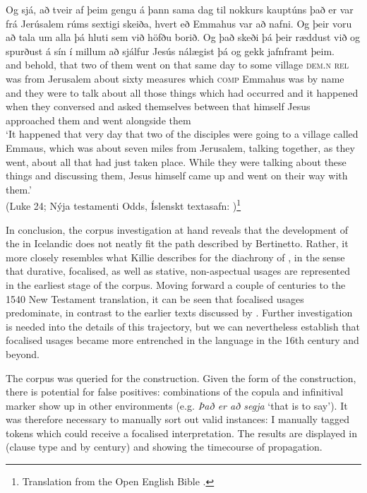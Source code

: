 \documentclass[output=paper,colorlinks,citecolor=brown]{langscibook}
\begin{document}
\ea\label{ex:durative_oddur} 
\gll Og sjá, að tveir af þeim gengu á þann sama dag til nokkurs kauptúns það er var frá Jerúsalem rúms sextigi skeiða, hvert eð Emmahus var að nafni. Og þeir voru að tala um alla þá hluti sem við höfðu borið. Og það skeði þá þeir ræddust við og spurðust á sín í millum að sjálfur Jesús nálægist þá og gekk jafnframt þeim.\\
and behold, that two of them went on that same day to some village \textsc{dem.n} \textsc{rel} was from Jerusalem about sixty measures which \textsc{comp} Emmahus was by name and they were to talk about all those things which {} had occurred and it happened when they conversed {} and asked {} themselves between {} that himself Jesus approached them and went alongside them\\
\glt `It happened that very day that two of the disciples were going to a village called Emmaus, which was about seven miles from Jerusalem, talking together, as they went, about all that had just taken place. While they were talking about these things and discussing them, Jesus himself came up and went on their way with them.' \\ \hfill (Luke 24; Nýja testamenti Odds, Íslenskt textasafn: \citeauthor{IslensktTextasafn2019} \citeyear{IslensktTextasafn2019})\footnote{Translation from the Open English Bible \citep{oeb2022}.}
\z

In conclusion, the corpus investigation at hand reveals that the development of the    in Icelandic does not neatly fit the path described by Bertinetto. Rather, it more closely resembles what Killie describes for the diachrony of , in the sense that durative, focalised, as well as stative, non-aspectual usages are represented in the earliest stage of the corpus. Moving forward a couple of centuries to the 1540 New Testament translation, it can be seen that focalised usages predominate, in contrast to the earlier texts discussed by \citet{benediktsson1976isl}. Further investigation is needed into the details of this trajectory, but we can nevertheless establish that focalised usages became more entrenched in the language in the 16th century and beyond. 

The  corpus was queried for the   construction. Given the form of the construction, there is potential for false positives: combinations of the copula and infinitival marker show up in other environments (e.g. \textit{Það er að segja} `that is to say'). It was therefore necessary to manually sort out valid instances: I manually tagged tokens which could receive a focalised interpretation. The results are displayed in  (clause type and  by century) and  showing the timecourse of propagation.
\end{document}
